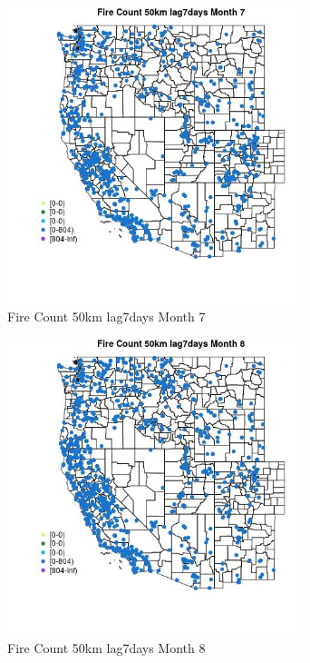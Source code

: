 \begin{figure} 
\centering  
\includegraphics[width=0.77\textwidth]{Code_Outputs/Report_ML_input_PM25_Step4_part_f_de_duplicated_aveswNAs_MapObsMo7Fire_Count_50km_lag7days.jpg} 
\caption{\label{fig:Report_ML_input_PM25_Step4_part_f_de_duplicated_aveswNAsMapObsMo7Fire_Count_50km_lag7days}Fire Count 50km lag7days Month 7} 
\end{figure} 
 

\begin{figure} 
\centering  
\includegraphics[width=0.77\textwidth]{Code_Outputs/Report_ML_input_PM25_Step4_part_f_de_duplicated_aveswNAs_MapObsMo8Fire_Count_50km_lag7days.jpg} 
\caption{\label{fig:Report_ML_input_PM25_Step4_part_f_de_duplicated_aveswNAsMapObsMo8Fire_Count_50km_lag7days}Fire Count 50km lag7days Month 8} 
\end{figure} 
 

